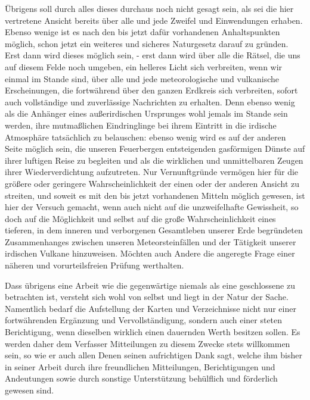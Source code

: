 \documentclass[a4paper, 11pt, oneside, polutonikogreek, german]{article}
\begin{document}
Übrigens soll durch alles dieses durchaus noch nicht gesagt sein, als sei die hier vertretene Ansicht bereits über alle und jede Zweifel und Einwendungen erhaben. Ebenso wenige ist es nach den bis jetzt dafür vorhandenen Anhaltspunkten möglich, schon jetzt ein weiteres und sicheres Naturgesetz darauf zu gründen. Erst dann wird dieses möglich sein, - erst dann wird über alle die Rätsel, die uns auf diesem Felde noch umgeben, ein helleres Licht sich verbreiten, wenn wir einmal im Stande sind, über alle und jede meteorologische und vulkanische Erscheinungen, die fortwährend über den ganzen Erdkreis sich verbreiten, sofort auch vollständige und zuverlässige Nachrichten zu erhalten. Denn ebenso wenig als die Anhänger eines außerirdischen Ursprunges wohl jemals im Stande sein werden, ihre mutmaßlichen Eindringlinge bei ihrem Eintritt in die irdische Atmosphäre tatsächlich zu belauschen: ebenso wenig wird es auf der anderen Seite möglich sein, die unseren Feuerbergen entsteigenden gasförmigen Dünste auf ihrer luftigen Reise zu begleiten und als die wirklichen und unmittelbaren Zeugen ihrer Wiederverdichtung aufzutreten. Nur Vernunftgründe vermögen hier für die größere oder geringere Wahrscheinlichkeit der einen oder der anderen Ansicht zu streiten, und soweit es mit den bis jetzt vorhandenen Mitteln möglich gewesen, ist hier der Versuch gemacht, wenn auch nicht auf die unzweifelhafte Gewissheit, so doch auf die Möglichkeit und selbst auf die große Wahrscheinlichkeit eines tieferen, in dem inneren und verborgenen Gesamtleben unserer Erde begründeten Zusammenhanges zwischen unseren Meteorsteinfällen und der Tätigkeit unserer irdischen Vulkane hinzuweisen. Möchten auch Andere die angeregte Frage einer näheren und vorurteilsfreien Prüfung werthalten.

Dass übrigens eine Arbeit wie die gegenwärtige niemals als eine geschlossene zu betrachten ist, versteht sich wohl von selbst und liegt in der Natur der Sache. Namentlich bedarf die Aufstellung der Karten und Verzeichnisse nicht nur einer fortwährenden Ergänzung und Vervollständigung, sondern auch einer steten Berichtigung, wenn dieselben wirklich einen dauernden Werth besitzen sollen. Es werden daher dem Verfasser Mitteilungen zu diesem Zwecke stets willkommen sein, so wie er auch allen Denen seinen aufrichtigen Dank sagt, welche ihm bisher in seiner Arbeit durch ihre freundlichen Mitteilungen, Berichtigungen und Andeutungen sowie durch sonstige Unterstützung behülflich und förderlich gewesen sind.
\clearpage
\vspace*{\fill}
\end{document}
